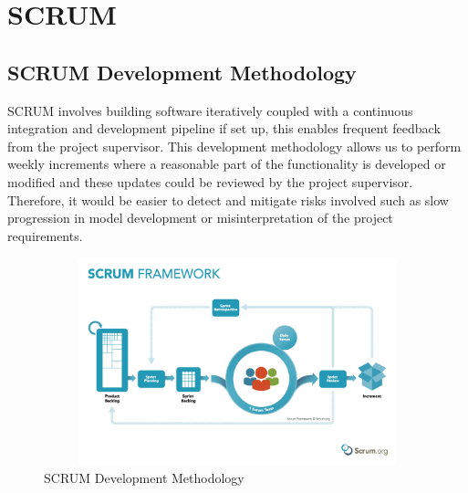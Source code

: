 
\chapter{SCRUM} \label{SCRUM} %


\section*{SCRUM Development Methodology}

SCRUM involves building software iteratively coupled with a continuous integration 
and development pipeline if set up, this enables frequent feedback 
from the project supervisor. This development methodology allows us to 
perform weekly increments where a reasonable part of the functionality is 
developed or modified and these updates could be reviewed by the project 
supervisor. Therefore, it would be easier to detect and mitigate risks involved such as 
slow progression in model development or misinterpretation of the project requirements.

\begin{figure}[th]
    \centering
    \includegraphics[width=15cm, height=6cm]{Images/SCRUM.png}
    \caption[SCRUM]{SCRUM Development Methodology \cite{SFP}}
    \label{fig:SCRUM}
    \end{figure}